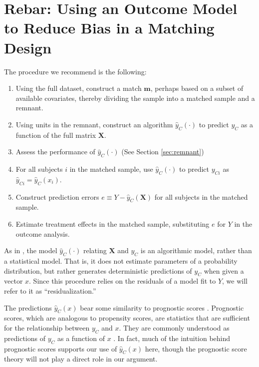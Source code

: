 \documentclass[12pt]{article}\usepackage[]{graphicx}\usepackage[]{color}
\newcommand{\yhat}{\hat{y}_C}
\newcommand{\match}{m}
\newcommand{\algorithm}{\hat{y}_C(\cdot)}
\newcommand{\covMat}{\bm{X}}
\newcommand{\covVec}{x}
\begin{document}
\section{Rebar: Using an Outcome Model to Reduce Bias in a Matching Design}\label{sec:rebarIntro}

The procedure we recommend is the following:
\begin{enumerate}
  \item Using the full dataset, construct a match $\bm{\match}$, perhaps
    based on a subset of available covariates, thereby dividing the sample
    into a matched sample and a remnant.
  \item Using units in the remnant, construct an algorithm
    $\algorithm$ to predict $y_C$ as a function of the full matrix $\covMat$.
  \item Assess the performance of $\algorithm$ (See Section \ref{sec:remnant})
  \item For all subjects  $i$ in the matched sample, use $\algorithm$
    to predict $y_{Ci}$ as $\hat{y}_{Ci}=\hat{y}_{C}(\covVec_i)$.
  \item Construct prediction errors $e\equiv Y-\hat{y}_C(\covMat)$ for all
    subjects in the matched sample.
  \item Estimate treatment effects in the matched sample,
    substituting $e$ for $Y$ in the outcome analysis.
\end{enumerate}
As in \citet{rosenbaum2002covariance}, the model $\algorithm$ relating $\covMat$ and $y_C$ is an algorithmic model, rather than a statistical model.
That is, it does not estimate parameters of a probability distribution, but rather generates deterministic predictions of $y_C$ when given a vector $\covVec$.
Since this procedure relies on the residuals of a model fit to $Y$, we
will refer to it as ``residualization.''

The predictions $\yhat (\covVec)$ bear some similarity to prognostic
scores \citep{hansen:2008biometrika}.
Prognostic scores, which are analogous to propensity scores, are
statistics that are sufficient for the relationship between $y_C$ and
$\covVec$.
They are commonly understood as predictions of $y_C$ as a function of
$\covVec$ \citep[e.g.][]{pane2013effectiveness}.
In fact, much of the intuition behind prognostic scores supports our
use of $\yhat (\covVec)$ here, though the prognostic score theory will not
play a direct role in our argument.
\end{document}
